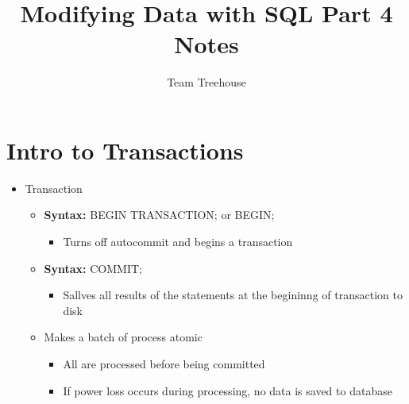 \documentclass[12pt]{article}
\begin{document}
\title{Modifying Data with SQL Part 4 Notes}
\author{Team Treehouse}
\maketitle

\bigskip

\section{Intro to Transactions}

\begin{itemize}
    \item Transaction
    \begin{itemize}
        \item \textbf{Syntax:} BEGIN TRANSACTION; or BEGIN;
        \begin{itemize}
            \item Turns off autocommit and begins a transaction
        \end{itemize}
        \item \textbf{Syntax:} COMMIT;
        \begin{itemize}
            \item Sallves all results of the statements at the begininng of transaction to disk
        \end{itemize}
        \item Makes a batch of process atomic
        \begin{itemize}
            \item All are processed before being committed
            \item If power loss occurs during processing, no data is saved to database
        \end{itemize}
    \end{itemize}
\end{itemize}
\end{document}

